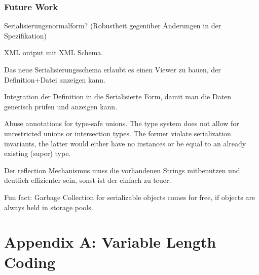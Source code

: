 \documentclass[a4paper,10pt]{article}
\begin{document}

\section{Future Work}

Serialisierungsnormalform? (Robustheit gegenüber Änderungen in der Spezifikation)

XML output mit XML Schema.

Das neue Serialisierungsschema erlaubt es einen Viewer zu bauen, der Definition+Datei anzeigen kann.

Integration der Definition in die Serialisierte Form, damit man die Daten generisch prüfen und anzeigen kann.

Abuse annotations for type-safe unions. The type system does not allow for unrestricted unions or intersection types. The former violate serialization invariants, the latter would either have no instances or be equal to an already existing (super) type.

Der reflection Mechanismus muss die vorhandenen Strings mitbenutzen und deutlich effizienter sein, sonst ist der einfach zu teuer.

Fun fact: Garbage Collection for serializable objects comes for free, if objects are always held in storage pools.

\newpage
\todos

\part{Appendix A: Variable Length Coding}
\end{document}

